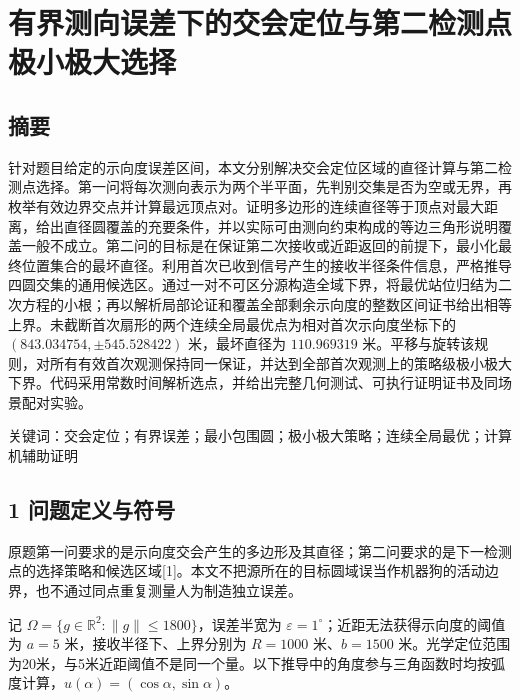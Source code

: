 \documentclass[
  11pt,
  fontset=none]{ctexart}
\author{}
\date{}
\begin{document}
\section{有界测向误差下的交会定位与第二检测点极小极大选择}\label{ux6709ux754cux6d4bux5411ux8befux5deeux4e0bux7684ux4ea4ux4f1aux5b9aux4f4dux4e0eux7b2cux4e8cux68c0ux6d4bux70b9ux6781ux5c0fux6781ux5927ux9009ux62e9}

\subsection{摘要}\label{ux6458ux8981}

针对题目给定的示向度误差区间，本文分别解决交会定位区域的直径计算与第二检测点选择。第一问将每次测向表示为两个半平面，先判别交集是否为空或无界，再枚举有效边界交点并计算最远顶点对。证明多边形的连续直径等于顶点对最大距离，给出直径圆覆盖的充要条件，并以实际可由测向约束构成的等边三角形说明覆盖一般不成立。第二问的目标是在保证第二次接收或近距返回的前提下，最小化最终位置集合的最坏直径。利用首次已收到信号产生的接收半径条件信息，严格推导四圆交集的通用候选区。通过一对不可区分源构造全域下界，将最优站位归结为二次方程的小根；再以解析局部论证和覆盖全部剩余示向度的整数区间证书给出相等上界。未截断首次扇形的两个连续全局最优点为相对首次示向度坐标下的
\((843.034754,\pm545.528422)\) 米，最坏直径为 \(110.969319\)
米。平移与旋转该规则，对所有有效首次观测保持同一保证，并达到全部首次观测上的策略级极小极大下界。代码采用常数时间解析选点，并给出完整几何测试、可执行证明证书及同场景配对实验。

关键词：交会定位；有界误差；最小包围圆；极小极大策略；连续全局最优；计算机辅助证明

\subsection{1
问题定义与符号}\label{ux95eeux9898ux5b9aux4e49ux4e0eux7b26ux53f7}

原题第一问要求的是示向度交会产生的多边形及其直径；第二问要求的是下一检测点的选择策略和候选区域{[}1{]}。本文不把源所在的目标圆域误当作机器狗的活动边界，也不通过同点重复测量人为制造独立误差。

记 \(\Omega=\{g\in\mathbb R^2:\|g\|\le1800\}\)，误差半宽为
\(\varepsilon=1^\circ\)；近距无法获得示向度的阈值为 \(a=5\)
米，接收半径下、上界分别为 \(R=1000\) 米、\(b=1500\)
米。光学定位范围为20米，与5米近距阈值不是同一个量。以下推导中的角度参与三角函数时均按弧度计算，\(u(\alpha)=(\cos\alpha,\sin\alpha)\)。
\end{document}
